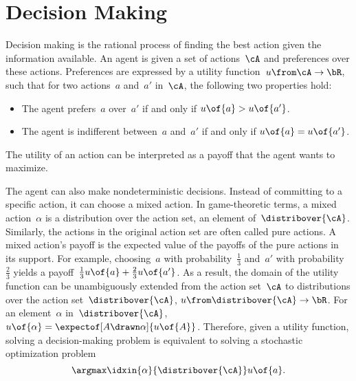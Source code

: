 \section{Decision Making}
\label{sec:static_decision_making}

Decision making is the rational process of finding the best action given the information available.
An agent is given a set of actions~\(\cA\) and preferences over these actions.
Preferences are expressed by a utility function~\(u \from \cA \to \bR\), such that for two actions~\(a\) and~\(a'\) in~\(\cA\), the following two properties hold:
\begin{itemize}
\item The agent prefers~\(a\) over~\(a'\) if and only if \(u \of {a} > u \of {a'}\).
\item The agent is indifferent between~\(a\) and~\(a'\) if and only if \(u \of {a} = u \of {a'}\).
\end{itemize}
The utility of an action can be interpreted as a payoff that the agent wants to maximize.

The agent can also make nondeterministic decisions.
Instead of committing to a specific action, it can choose a mixed action.
In game-theoretic terms, a mixed action~\(\alpha\) is a distribution over the action set, \ie an element of~\(\distribover{\cA}\).
Similarly, the actions in the original action set are often called pure actions.
A mixed action's payoff is the expected value of the payoffs of the pure actions in its support.
For example, choosing~\(a\) with probability~\(\frac{1}{3}\) and~\(a'\) with probability~\(\frac{2}{3}\) yields a payoff~\(\frac{1}{3} u \of {a} + \frac{2}{3} u \of {a'}\).
As a result, the domain of the utility function can be unambiguously extended from the action set~\(\cA\) to distributions over the action set~\(\distribover {\cA}\), \ie \(u \from \distribover{\cA} \to \bR\).
For an element~\(\alpha \) in~\( \distribover {\cA}\), \(u \of {\alpha} = \expectof[A \drawn \alpha]{u \of {A}}\).
Therefore, given a utility function, solving a decision-making problem is equivalent to solving a stochastic optimization problem
\[
\argmax\idxin{\alpha}{\distribover{\cA}} u \of {a}.
\]


